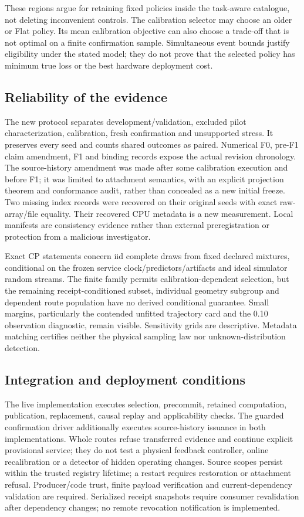 These regions argue for retaining fixed policies inside the task-aware catalogue, not deleting inconvenient controls. The calibration selector may choose an older or Flat policy. Its mean calibration objective can also choose a trade-off that is not optimal on a finite confirmation sample. Simultaneous event bounds justify eligibility under the stated model; they do not prove that the selected policy has minimum true loss or the best hardware deployment cost.

\subsection{Reliability of the evidence}
The new protocol separates development/validation, excluded pilot characterization, calibration, fresh confirmation and unsupported stress. It preserves every seed and counts shared outcomes as paired. Numerical F0, pre-F1 claim amendment, F1 and binding records expose the actual revision chronology. The source-history amendment was made after some calibration execution and before F1; it was limited to attachment semantics, with an explicit projection theorem and conformance audit, rather than concealed as a new initial freeze. Two missing index records were recovered on their original seeds with exact raw-array/file equality. Their recovered CPU metadata is a new measurement. Local manifests are consistency evidence rather than external preregistration or protection from a malicious investigator.

Exact CP statements concern iid complete draws from fixed declared mixtures, conditional on the frozen service clock/predictors/artifacts and ideal simulator random streams. The finite family permits calibration-dependent selection, but the remaining receipt-conditioned subset, individual geometry subgroup and dependent route population have no derived conditional guarantee. Small margins, particularly the contended unfitted trajectory card and the 0.10 observation diagnostic, remain visible. Sensitivity grids are descriptive. Metadata matching certifies neither the physical sampling law nor unknown-distribution detection.

\subsection{Integration and deployment conditions}
The live implementation executes selection, precommit, retained computation, publication, replacement, causal replay and applicability checks. The guarded confirmation driver additionally executes source-history issuance in both implementations. Whole routes refuse transferred evidence and continue explicit provisional service; they do not test a physical feedback controller, online recalibration or a detector of hidden operating changes. Source scopes persist within the trusted registry lifetime; a restart requires restoration or attachment refusal. Producer/code trust, finite payload verification and current-dependency validation are required. Serialized receipt snapshots require consumer revalidation after dependency changes; no remote revocation notification is implemented.

